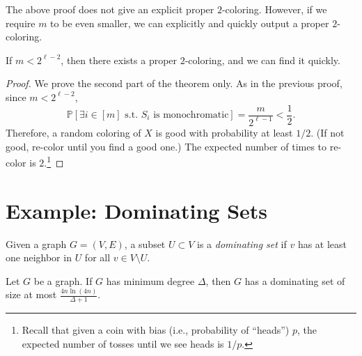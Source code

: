 \documentclass[letterpaper, reqno,11pt]{article}
\newcommand{\PP}{\mathbb{P}}
\begin{document}
The above proof does not give an explicit proper $2$-coloring. However, if we require $m$ to be even smaller, we can explicitly and quickly output a proper $2$-coloring.

\begin{theorem}
  If $m < 2^{\ell - 2}$, then there exists a proper $2$-coloring, and we can find it quickly.
\end{theorem}

\begin{proof}
  We prove the second part of the theorem only. As in the previous proof, since $m < 2^{\ell - 2}$,
  $$ \PP\left[\exists i \in [m] \text{ s.t.\ $S_i$ is monochromatic}\right] = \frac{m}{2^{\ell - 1}} < \frac{1}{2}. $$
  Therefore, a random coloring of $X$ is good with probability at least $1/2$. (If not good, re-color until you find a good one.) The expected number of times to re-color is $2$.\footnote{Recall that given a coin with bias (i.e., probability of ``heads'') $p$, the expected number of tosses until we see heads is $1/p$.}
\end{proof}

\section{Example: Dominating Sets}

\begin{definition}
  Given a graph $G = (V, E)$, a subset $U \subset V$ is a \emph{dominating set} if $v$ has at least one neighbor in $U$ for all $v \in V \setminus U$.
\end{definition}

\begin{theorem}
  Let $G$ be a graph. If $G$ has minimum degree $\Delta$, then $G$ has a dominating set of size at most $\frac{4n\ln(4n)}{\Delta + 1}$.
\end{theorem}
\end{document}
